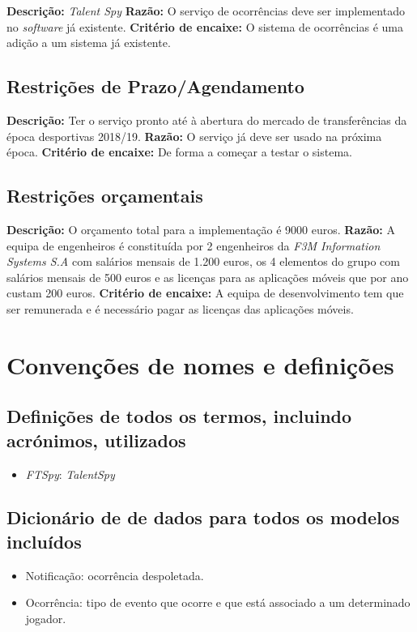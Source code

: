\noindent\textbf{Descrição:} \emph{Talent Spy}
\newline\textbf{Razão:} O serviço de ocorrências deve ser implementado no \emph{software} já existente.
\newline\textbf{Critério de encaixe:} O sistema de ocorrências é uma adição a um sistema já existente.

\subsection{Restrições de Prazo/Agendamento}

\noindent\textbf{Descrição:} Ter o serviço pronto até à abertura do mercado de transferências da época desportivas 2018/19.
\newline\textbf{Razão:} O serviço já deve ser usado na próxima época.
\newline\textbf{Critério de encaixe:} De forma a começar a testar o sistema.

\subsection{Restrições orçamentais}

\noindent\textbf{Descrição:} O orçamento total para a implementação é 9000 euros.
\newline\textbf{Razão:} A equipa de engenheiros é constituída por 2 engenheiros da \emph{F3M Information Systems S.A} com salários mensais de 1.200 euros, os 4 elementos do grupo com salários mensais de 500 euros e as licenças para as aplicações móveis que por ano custam 200 euros.
\newline\textbf{Critério de encaixe:} A equipa de desenvolvimento tem que ser remunerada e é necessário pagar as licenças das aplicações móveis.

\newpage

\section{Convenções de nomes e definições}

\subsection{Definições de todos os termos, incluindo acrónimos, utilizados}

\begin{itemize}
    \item \emph{FTSpy}: \emph{TalentSpy}
\end{itemize}

\subsection{Dicionário de de dados para todos os modelos incluídos}

\begin{itemize}
    \item Notificação: ocorrência despoletada.
    \item Ocorrência: tipo de evento que ocorre e que está associado a um determinado jogador.
\end{itemize}